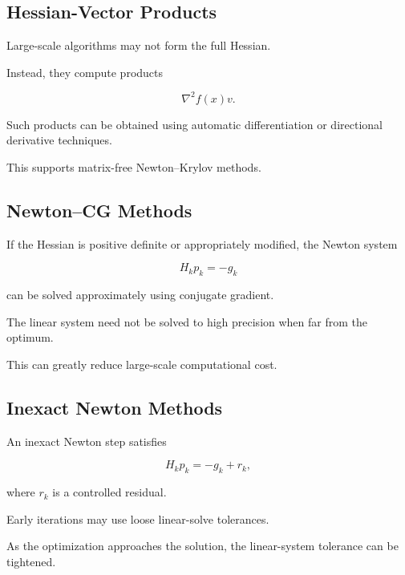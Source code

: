 \subsection{Hessian-Vector Products}
\label{subsec:hessian-vector-products}

Large-scale algorithms may not form the full Hessian.

Instead, they compute products

\[
\boxed{
\nabla^2f(x)v.
}
\]

Such products can be obtained using automatic differentiation or
directional derivative techniques.

This supports matrix-free Newton--Krylov methods.

\subsection{Newton--CG Methods}
\label{subsec:newton-cg-methods}

If the Hessian is positive definite or appropriately modified, the Newton
system

\[
\boxed{
H_kp_k=-g_k
}
\]

can be solved approximately using conjugate gradient.

The linear system need not be solved to high precision when far from the
optimum.

This can greatly reduce large-scale computational cost.

\subsection{Inexact Newton Methods}
\label{subsec:inexact-newton-methods}

An inexact Newton step satisfies

\[
\boxed{
H_kp_k
=
-g_k+r_k,
}
\]

where \(r_k\) is a controlled residual.

Early iterations may use loose linear-solve tolerances.

As the optimization approaches the solution, the linear-system tolerance
can be tightened.

